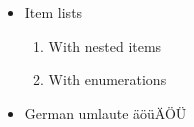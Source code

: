 \begin{itemize}
\item{Item lists
  \begin{enumerate}
  \item{With nested items}
  \item{With enumerations}
  \end{enumerate}}
\item{German umlaute \"a\"o\"u\"A\"O\"U}
\end{itemize}
